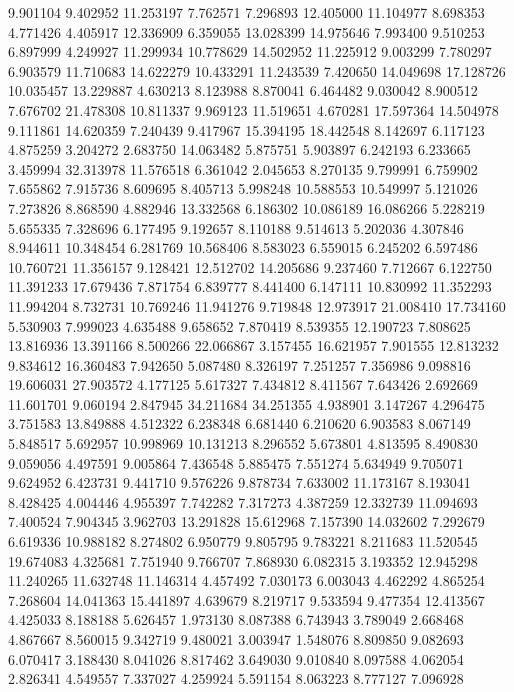 9.901104
9.402952
11.253197
7.762571
7.296893
12.405000
11.104977
8.698353
4.771426
4.405917
12.336909
6.359055
13.028399
14.975646
7.993400
9.510253
6.897999
4.249927
11.299934
10.778629
14.502952
11.225912
9.003299
7.780297
6.903579
11.710683
14.622279
10.433291
11.243539
7.420650
14.049698
17.128726
10.035457
13.229887
4.630213
8.123988
8.870041
6.464482
9.030042
8.900512
7.676702
21.478308
10.811337
9.969123
11.519651
4.670281
17.597364
14.504978
9.111861
14.620359
7.240439
9.417967
15.394195
18.442548
8.142697
6.117123
4.875259
3.204272
2.683750
14.063482
5.875751
5.903897
6.242193
6.233665
3.459994
32.313978
11.576518
6.361042
2.045653
8.270135
9.799991
6.759902
7.655862
7.915736
8.609695
8.405713
5.998248
10.588553
10.549997
5.121026
7.273826
8.868590
4.882946
13.332568
6.186302
10.086189
16.086266
5.228219
5.655335
7.328696
6.177495
9.192657
8.110188
9.514613
5.202036
4.307846
8.944611
10.348454
6.281769
10.568406
8.583023
6.559015
6.245202
6.597486
10.760721
11.356157
9.128421
12.512702
14.205686
9.237460
7.712667
6.122750
11.391233
17.679436
7.871754
6.839777
8.441400
6.147111
10.830992
11.352293
11.994204
8.732731
10.769246
11.941276
9.719848
12.973917
21.008410
17.734160
5.530903
7.999023
4.635488
9.658652
7.870419
8.539355
12.190723
7.808625
13.816936
13.391166
8.500266
22.066867
3.157455
16.621957
7.901555
12.813232
9.834612
16.360483
7.942650
5.087480
8.326197
7.251257
7.356986
9.098816
19.606031
27.903572
4.177125
5.617327
7.434812
8.411567
7.643426
2.692669
11.601701
9.060194
2.847945
34.211684
34.251355
4.938901
3.147267
4.296475
3.751583
13.849888
4.512322
6.238348
6.681440
6.210620
6.903583
8.067149
5.848517
5.692957
10.998969
10.131213
8.296552
5.673801
4.813595
8.490830
9.059056
4.497591
9.005864
7.436548
5.885475
7.551274
5.634949
9.705071
9.624952
6.423731
9.441710
9.576226
9.878734
7.633002
11.173167
8.193041
8.428425
4.004446
4.955397
7.742282
7.317273
4.387259
12.332739
11.094693
7.400524
7.904345
3.962703
13.291828
15.612968
7.157390
14.032602
7.292679
6.619336
10.988182
8.274802
6.950779
9.805795
9.783221
8.211683
11.520545
19.674083
4.325681
7.751940
9.766707
7.868930
6.082315
3.193352
12.945298
11.240265
11.632748
11.146314
4.457492
7.030173
6.003043
4.462292
4.865254
7.268604
14.041363
15.441897
4.639679
8.219717
9.533594
9.477354
12.413567
4.425033
8.188188
5.626457
1.973130
8.087388
6.743943
3.789049
2.668468
4.867667
8.560015
9.342719
9.480021
3.003947
1.548076
8.809850
9.082693
6.070417
3.188430
8.041026
8.817462
3.649030
9.010840
8.097588
4.062054
2.826341
4.549557
7.337027
4.259924
5.591154
8.063223
8.777127
7.096928
